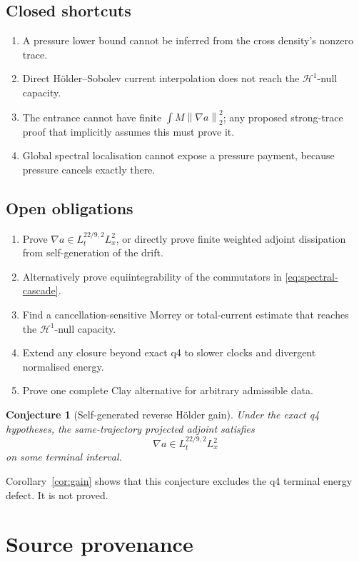 \documentclass[11pt]{article}
\newtheorem{conjecture}[theorem]{Conjecture}
\theoremstyle{remark}
\newcommand{\norm}[1]{\left\|#1\right\|}
\newcommand{\HH}{\mathcal H}
\begin{document}
\subsection*{Closed shortcuts}

\begin{enumerate}
\item A pressure lower bound cannot be inferred from the cross density's
nonzero trace.
\item Direct Hölder--Sobolev current interpolation does not reach the
\(\HH^1\)-null capacity.
\item The entrance cannot have finite
\(\int M\norm{\nabla a}_2^2\); any proposed strong-trace proof that
implicitly assumes this must prove it.
\item Global spectral localisation cannot expose a pressure payment,
because pressure cancels exactly there.
\end{enumerate}

\subsection*{Open obligations}

\begin{enumerate}
\item Prove \(\nabla a\in L_t^{22/9,2}L_x^2\), or directly prove
finite weighted adjoint dissipation from self-generation of the drift.
\item Alternatively prove equiintegrability of the commutators in
\eqref{eq:spectral-cascade}.
\item Find a cancellation-sensitive Morrey or total-current estimate
that reaches the \(\HH^1\)-null capacity.
\item Extend any closure beyond exact q4 to slower clocks and divergent
normalised energy.
\item Prove one complete Clay alternative for arbitrary admissible data.
\end{enumerate}

\begin{conjecture}[Self-generated reverse H\"older gain]
Under the exact q4 hypotheses, the same-trajectory projected adjoint
satisfies
\[
 \nabla a\in L_t^{22/9,2}L_x^2
\]
on some terminal interval.
\end{conjecture}

Corollary~\ref{cor:gain} shows that this conjecture excludes the q4
terminal energy defect.  It is not proved.

\section*{Source provenance}
\end{document}
